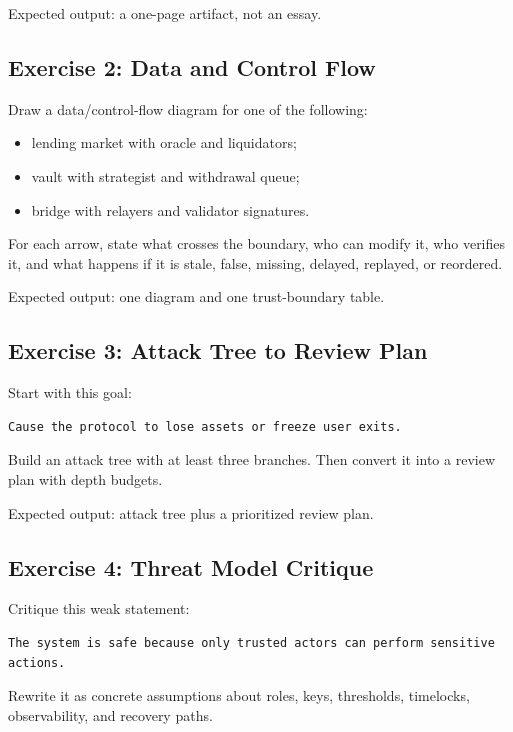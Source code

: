 Expected output: a one-page artifact, not an essay.

\subsection{Exercise 2: Data and Control Flow}

Draw a data/control-flow diagram for one of the following:

\begin{itemize}
\tightlist
\item
  lending market with oracle and liquidators;
\item
  vault with strategist and withdrawal queue;
\item
  bridge with relayers and validator signatures.
\end{itemize}

For each arrow, state what crosses the boundary, who can modify it, who verifies it, and what happens if it is stale, false, missing, delayed, replayed, or reordered.

Expected output: one diagram and one trust-boundary table.

\subsection{Exercise 3: Attack Tree to Review Plan}

Start with this goal:

\begin{lstlisting}
Cause the protocol to lose assets or freeze user exits.
\end{lstlisting}

Build an attack tree with at least three branches. Then convert it into a review plan with depth budgets.

Expected output: attack tree plus a prioritized review plan.

\subsection{Exercise 4: Threat Model Critique}

Critique this weak statement:

\begin{lstlisting}
The system is safe because only trusted actors can perform sensitive actions.
\end{lstlisting}

Rewrite it as concrete assumptions about roles, keys, thresholds, timelocks, observability, and recovery paths.

